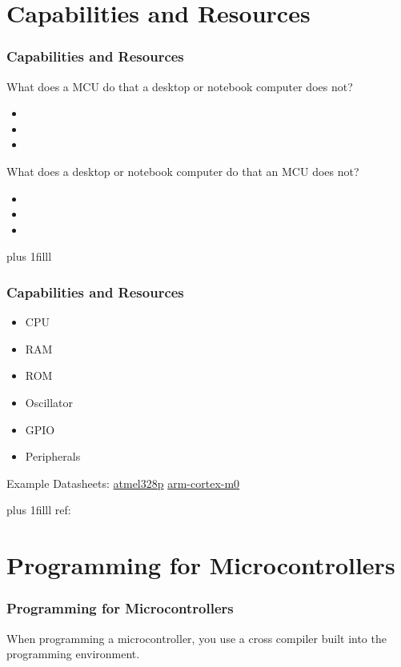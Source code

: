 \documentclass[fleqn]{beamer} %
\newcommand{\sectiontitleIV}{Capabilities and Resources}
\newcommand{\sectiontitleV}{Programming for Microcontrollers}
\newcommand{\btVFill}{\vskip0pt plus 1filll}
\begin{document}
\section{\sectiontitleIV}	
	\begin{frame}[label=sectionIV,containsverbatim] \small
		\frametitle{\sectiontitleIV}    
	
		What does a MCU do that a desktop or notebook computer does not?
		
		\begin{itemize}
			
			\item
			\item
			\item
		\end{itemize}
	
	What does a desktop or notebook computer do that an MCU does not?
	
	\begin{itemize}
		
		\item
		\item
		\item
	\end{itemize}
		

		 

		\btVFill
	\end{frame}

	\begin{frame}[label=sectionIV,containsverbatim] \small
	\frametitle{\sectiontitleIV}    
	
	\begin{itemize}
		\item CPU
		\item RAM
		\item ROM
		\item Oscillator
		\item GPIO 
		\item Peripherals 
		
	\end{itemize}

Example Datasheets: \href{https://components101.com/microcontrollers/atmega328p-pinout-features-datasheet}{atmel328p}
\href{https://www.nxp.com/docs/en/data-sheet/LPC8N04.pdf}{arm-cortex-m0}

	
	\btVFill
	\tiny{ref:} 
\end{frame}

\section{\sectiontitleV}	
	\begin{frame}[label=sectionV,containsverbatim] \small
	\frametitle{\sectiontitleV}    
	
	When programming a microcontroller, you use a {\BL cross compiler} built into the programming environment.
	

\end{frame}
\end{document}
